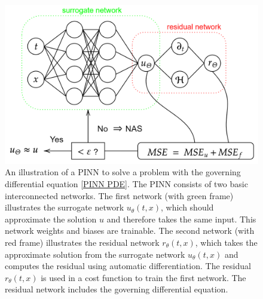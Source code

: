 \begin{figure}[H]
    \begin{center}
        \includegraphics[scale=0.3]{img/diagram-20220212.png}
    \end{center}
    \caption{An illustration of a PINN to solve a problem with the governing differential equation \cref{PINN PDE}. The PINN consists of two basic interconnected networks. The first network (with green frame) illustrates the surrogate network $u_\theta(t,x)$, which should approximate the solution $u$ and therefore takes the same input. This network weights and biases are trainable. The second network (with red frame) illustrates the residual network $r_\theta(t,x)$, which takes the approximate solution from the surrogate network $u_\theta(t,x)$ and computes the residual using automatic differentiation. The residual $r_\theta(t,x)$ is used in a cost function to train the first network. The residual network includes the governing differential equation.}
    \label{fig6}
\end{figure}

